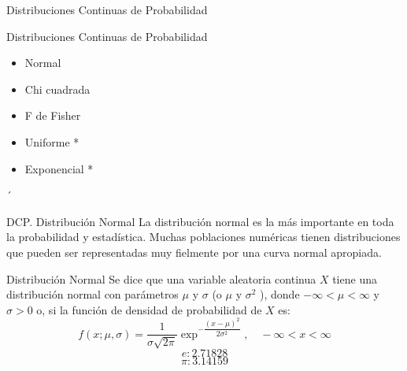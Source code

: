 \documentclass[11pt]{beamer}
\begin{document}
      \begin{frame}{Distribuciones Continuas de Probabilidad}

        \begin{block}{Distribuciones Continuas de Probabilidad}
          \begin{itemize}
            \item Normal
            \item Chi cuadrada
            \item F de Fisher
            \item Uniforme *
            \item Exponencial *
          \end{itemize}
        ´\end{block}
      \end{frame}

      \begin{frame}{DCP. Distribución Normal}
          La distribución normal es la más importante en toda la probabilidad y estadística. Muchas poblaciones numéricas tienen distribuciones que pueden ser representadas muy fielmente por
una curva normal apropiada.
          \pause
          \begin{block}{Distribuci\'on Normal}
            Se dice que una variable aleatoria continua $X$ tiene una distribución normal con parámetros $\mu$ y $\sigma$ (o $\mu$ y $\sigma^2$ ), donde $-\infty < \mu < \infty$ y $\sigma > 0$ o, si la función de densidad de
probabilidad de $X$ es:
            \pause
            $$f(x; \mu,\sigma) = \dfrac{1}{\sigma\sqrt{2\pi}} \exp^{-\dfrac{(x-\mu)^2}{2\sigma^2}} ,\quad -\infty < x < \infty$$
            $$e: 2.71828$$
            $$\pi: 3.14159$$
          \end{block}
      \end{frame}
\end{document}
